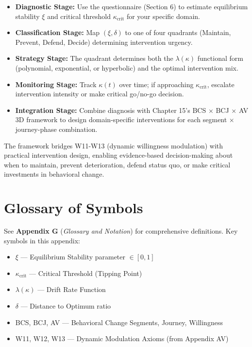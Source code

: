 \documentclass[11pt, a4paper]{article}
\begin{document}
\begin{itemize}
    \item \textbf{Diagnostic Stage:} Use the questionnaire (Section 6) to estimate equilibrium stability $\xi$ and critical threshold $\kappa_{\text{crit}}$ for your specific domain.

    \item \textbf{Classification Stage:} Map $(\xi, \delta)$ to one of four quadrants (Maintain, Prevent, Defend, Decide) determining intervention urgency.

    \item \textbf{Strategy Stage:} The quadrant determines both the $\lambda(\kappa)$ functional form (polynomial, exponential, or hyperbolic) and the optimal intervention mix.

    \item \textbf{Monitoring Stage:} Track $\kappa(t)$ over time; if approaching $\kappa_{\text{crit}}$, escalate intervention intensity or make critical go/no-go decision.

    \item \textbf{Integration Stage:} Combine diagnosis with Chapter 15's BCS × BCJ × AV 3D framework to design domain-specific interventions for each segment × journey-phase combination.
\end{itemize}

The framework bridges W11-W13 (dynamic willingness modulation) with practical intervention design, enabling evidence-based decision-making about when to maintain, prevent deterioration, defend status quo, or make critical investments in behavioral change.


\section{Glossary of Symbols}
\label{sec:bb-glossary}

See \textbf{Appendix G} (\textit{Glossary and Notation}) for comprehensive definitions.
Key symbols in this appendix:

\begin{itemize}[nosep]
    \item $\xi$ --- Equilibrium Stability parameter $\in [0,1]$
    \item $\kappa_{\text{crit}}$ --- Critical Threshold (Tipping Point)
    \item $\lambda(\kappa)$ --- Drift Rate Function
    \item $\delta$ --- Distance to Optimum ratio
    \item BCS, BCJ, AV --- Behavioral Change Segments, Journey, Willingness
    \item W11, W12, W13 --- Dynamic Modulation Axioms (from Appendix AV)
\end{itemize}
\end{document}
